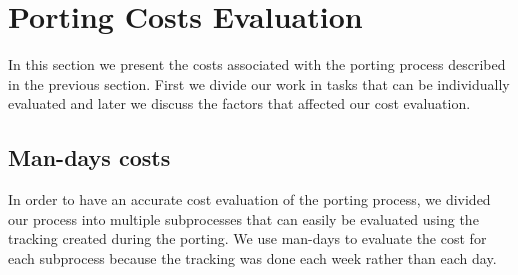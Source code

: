 \section{Porting Costs Evaluation}

%
%
%

In this section we present the costs associated with the porting process
described in the previous section. First we divide our work in tasks that can
be individually evaluated and later we discuss the factors that affected our
cost evaluation.

\subsection{Man-days costs}

In order to have an accurate cost evaluation of the porting process, we divided
our process into multiple subprocesses that can easily be evaluated using the
tracking created during the porting. We use man-days to evaluate the
cost for each subprocess because the tracking was done each week rather than
each day.


